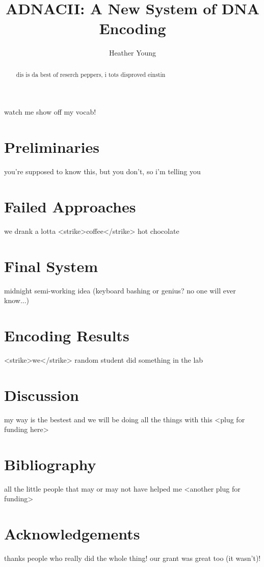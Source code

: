 \documentclass{article}
\title{ADNACII: A New System of DNA Encoding}
\author{Heather Young}
\begin{document}
\maketitle

\begin{abstract}
dis is da best of reserch peppers, i tots disproved einstin
\end{abstract}
watch me show off my vocab!
\section{Preliminaries}
you're supposed to know this, but you don't, so i'm telling you
\section{Failed Approaches}
we drank a lotta <strike>coffee</strike> hot chocolate
\section{Final System}
midnight semi-working idea (keyboard bashing or genius? no one will ever know...)
\section{Encoding Results}
<strike>we</strike> random student did something in the lab
\section{Discussion}
my way is the bestest and we will be doing all the things with this <plug for funding here>
\section{Bibliography}
all the little people that may or may not have helped me
<another plug for funding>
\section{Acknowledgements}
thanks people who really did the whole thing! our grant was great too (it wasn't)!
\end{document}
